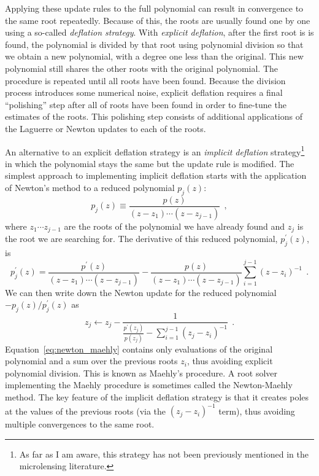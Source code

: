 \documentclass[12pt,dvipsnames]{report}
\newcommand{\ssf}[1]{\textsf{#1}}
\newcommand{\hquad}{~~}
\begin{document}
Applying these update rules to the full polynomial can result in convergence to the same 
root repeatedly. Because of this, the roots are usually found  one by one using a so-called
\emph{deflation strategy}. With \emph{explicit deflation}, after the first root is 
is found, the polynomial is divided by that root using polynomial division so 
that we  obtain a new  polynomial, with a degree one less than the original. This new
polynomial still shares the other roots with the original polynomial.
The procedure is repeated until all roots have been found. Because the division
process introduces some numerical noise, explicit deflation requires a final ``polishing''
step after all of roots have been found in order to fine-tune the estimates of the roots. 
This polishing step  consists of additional applications of the Laguerre or Newton 
updates to each of the roots.

An alternative to an explicit deflation strategy is an \emph{implicit deflation}
strategy\footnote{As far as I am aware, this strategy has not been previously mentioned in the 
microlensing literature.} in which the polynomial stays the same but the 
update rule is modified. The simplest approach to implementing implicit deflation starts with
the application of Newton's method to a reduced polynomial $p_j(z)$:
\begin{equation}
    p_{j}(z) \equiv \frac{p(z)}{\left(z-z_1\right) \cdots\left(z-z_{j-1}\right)}
    \hquad ,
    \label{eq:reduced_poly}
\end{equation}
where $z_1\cdots z_{j-1}$ are the roots of the polynomial we have already found and
$z_j$ is the root we are searching for.
The derivative of this reduced polynomial, $p^\prime_j(z)$, is
\begin{equation}
    p_{j}^{\prime}(z)=\frac{p^{\prime}(z)}{\left(z-z_1\right) \cdots\left(z-z_{j-1}\right)}-\frac{p(z)}{\left(z-z_1\right) \cdots\left(z-z_{j-1}\right)} \sum_{i=1}^{j-1}\left(z-z_{i}\right)^{-1}
    \hquad .
\end{equation}
We can then write down the Newton update for the reduced polynomial 
$-p_j(z)/p_j^{\prime}(z)$
as
\begin{equation}
    z_j \leftarrow z_j - \frac{1}{\frac{p^\prime (z_j)}{p(z_j)} - \sum_{i=1}^{j-1}\left(z_j-z_{i}\right)^{-1}}
    \hquad .
    \label{eq:newton_maehly}
\end{equation}
Equation~\ref{eq:newton_maehly} contains only evaluations of the original polynomial 
and a sum over the previous roots $z_i$, thus avoiding explicit polynomial 
division.  This is known as \ssf{Maehly's procedure}. A root solver implementing the 
Maehly procedure is sometimes called the \ssf{Newton-Maehly} method.
The key feature of the implicit deflation strategy is that it creates poles at the
values of the previous roots (via the $(z_j-z_i)^{-1}$ term), thus avoiding multiple
convergences to the same root.
\end{document}
